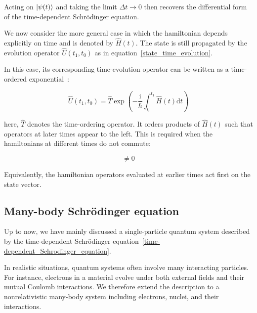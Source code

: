 Acting on $\ket{\psi(t)}$ and taking the limit $\Delta t\to 0$ then recovers the differential form of the time-dependent Schrödinger equation.


We now consider the more general case in which the hamiltonian depends explicitly on time and is denoted by $\hat{H}(t)$.
The state is still propagated by the evolution operator $\hat{U}(t_1,t_0)$ as in equation~\eqref{state_time_evolution}.

In this case, its corresponding time-evolution operator can be written as a time-ordered exponential~\cite{sakurai2020modern}:

\begin{equation}
    \hat{U}(t_1,t_0)=\hat{T}\exp\left(-\frac{\mathrm{i}}{\hbar}\int_{t_0}^{t_1}\hat{H}(t)\mathrm{d}t\right)
\label{time-ordering_operator}
\end{equation}

here, $\hat{T}$ denotes the time-ordering operator.
It orders products of $\hat{H}(t)$ such that operators at later times appear to the left.
This is required when the hamiltonians at different times do not commute:

\begin{equation}
    [\hat{H}(t),\hat{H}(t')]\neq 0
\label{hamiltonian_noncommutativity}
\end{equation}

Equivalently, the hamiltonian operators evaluated at earlier times act first on the state vector.

\subsection{Many-body Schrödinger equation}\label{sec:manybody_schrodinger_equation}

Up to now, we have mainly discussed a single-particle quantum system described by the time-dependent Schrödinger equation~\eqref{time-dependent_Schrodinger_equation}.

In realistic situations, quantum systems often involve many interacting particles.
For instance, electrons in a material evolve under both external fields and their mutual Coulomb interactions.
We therefore extend the description to a nonrelativistic many-body system including electrons, nuclei, and their interactions.

